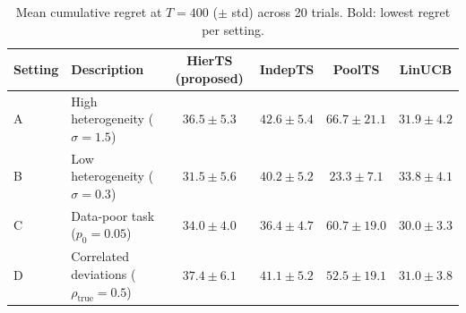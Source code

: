 \begin{table}[ht]
\centering
\caption{Mean cumulative regret at $T=400$ ($\pm$ std) across 20 trials. Bold: lowest regret per setting.}
\label{tab:results}
\begin{tabular}{llcccc}
\toprule
Setting & Description & HierTS (proposed) & IndepTS & PoolTS & LinUCB \\
\midrule
  A & High heterogeneity ($\sigma=1.5$) & $36.5\pm5.3$ & $42.6\pm5.4$ & $66.7\pm21.1$ & \textbf{$31.9\pm4.2$} \\
  B & Low heterogeneity ($\sigma=0.3$) & $31.5\pm5.6$ & $40.2\pm5.2$ & \textbf{$23.3\pm7.1$} & $33.8\pm4.1$ \\
  C & Data-poor task ($p_0=0.05$) & $34.0\pm4.0$ & $36.4\pm4.7$ & $60.7\pm19.0$ & \textbf{$30.0\pm3.3$} \\
  D & Correlated deviations ($\rho_{\text{true}}=0.5$) & $37.4\pm6.1$ & $41.1\pm5.2$ & $52.5\pm19.1$ & \textbf{$31.0\pm3.8$} \\
\bottomrule
\end{tabular}
\end{table}